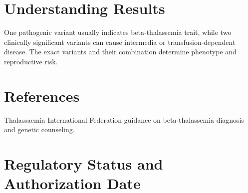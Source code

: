 \section*{Understanding Results}
One pathogenic variant usually indicates beta-thalassemia trait, while two clinically significant variants can cause intermedia or transfusion-dependent disease. The exact variants and their combination determine phenotype and reproductive risk.

\section*{References}
Thalassaemia International Federation guidance on beta-thalassemia diagnosis and genetic counseling.

\clearpage


\section*{Regulatory Status and Authorization Date}

\clearpage

